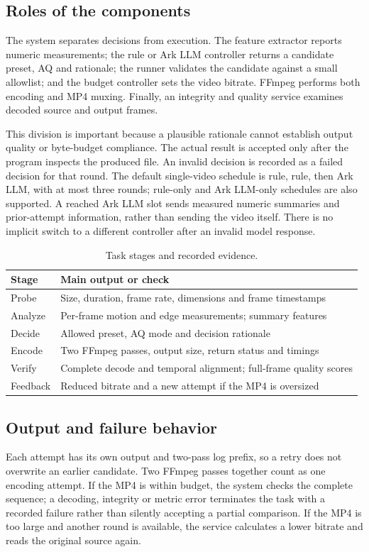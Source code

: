 \documentclass[conference]{IEEEtran}
\begin{document}
\subsection{Roles of the components}
The system separates decisions from execution. The feature extractor reports numeric measurements; the rule or Ark LLM controller returns a candidate preset, AQ and rationale; the runner validates the candidate against a small allowlist; and the budget controller sets the video bitrate. FFmpeg performs both encoding and MP4 muxing. Finally, an integrity and quality service examines decoded source and output frames.

This division is important because a plausible rationale cannot establish output quality or byte-budget compliance. The actual result is accepted only after the program inspects the produced file. An invalid decision is recorded as a failed decision for that round. The default single-video schedule is rule, rule, then Ark LLM, with at most three rounds; rule-only and Ark LLM-only schedules are also supported. A reached Ark LLM slot sends measured numeric summaries and prior-attempt information, rather than sending the video itself. There is no implicit switch to a different controller after an invalid model response.

\begin{table}[H]\centering\setlength{\tabcolsep}{4pt}\caption{Task stages and recorded evidence.}\label{tab:stages}
\begin{tabular}{p{}p{}}\toprule
Stage & Main output or check\\\midrule
Probe & Size, duration, frame rate, dimensions and frame timestamps\\
Analyze & Per-frame motion and edge measurements; summary features\\
Decide & Allowed preset, AQ mode and decision rationale\\
Encode & Two FFmpeg passes, output size, return status and timings\\
Verify & Complete decode and temporal alignment; full-frame quality scores\\
Feedback & Reduced bitrate and a new attempt if the MP4 is oversized\\\bottomrule
\end{tabular}\end{table}

\subsection{Output and failure behavior}
Each attempt has its own output and two-pass log prefix, so a retry does not overwrite an earlier candidate. Two FFmpeg passes together count as one encoding attempt. If the MP4 is within budget, the system checks the complete sequence; a decoding, integrity or metric error terminates the task with a recorded failure rather than silently accepting a partial comparison. If the MP4 is too large and another round is available, the service calculates a lower bitrate and reads the original source again.
\end{document}
